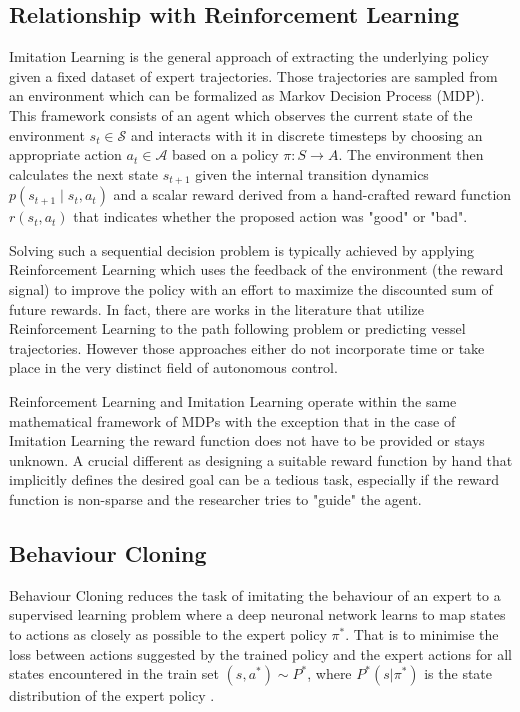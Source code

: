 \documentclass[conference]{IEEEtran}
\begin{document}
\subsection{Relationship with Reinforcement Learning}
Imitation Learning is the general approach of extracting the underlying policy given a fixed dataset of expert trajectories. Those trajectories are sampled from an environment which can be  formalized as Markov Decision Process (MDP). This framework consists of an agent which observes the current state of the environment $s_t \in \mathcal{S}$ and interacts with it in discrete timesteps by choosing an appropriate action $a_t \in \mathcal{A}$ based on a policy $\pi: S \rightarrow A$. The environment then calculates the next state $s_{t+1}$ given the internal transition dynamics $p(s_{t+1} \mid s_t, a_t)$  and a scalar reward derived from a hand-crafted reward function $r(s_t, a_t)$ that indicates whether the proposed action was "good" or "bad".
\par
Solving such a sequential decision problem is typically achieved by applying Reinforcement Learning which uses the feedback of the environment (the reward signal) to improve the policy with an effort to maximize the discounted sum of future rewards. In fact, there are works in the literature that utilize Reinforcement Learning to the path following problem or predicting vessel trajectories. However those approaches either do not incorporate time or take place in the very distinct field of autonomous control. 
\par
Reinforcement Learning and Imitation Learning operate within the same mathematical framework of MDPs with the exception that in the case of Imitation Learning the reward function does not have to be provided or stays unknown. A crucial different as designing a suitable reward function by hand that implicitly defines the desired goal can be a tedious task, especially if the reward function is non-sparse and the researcher tries to "guide" the agent.

\subsection{Behaviour Cloning}
Behaviour Cloning reduces the task of imitating the behaviour of an expert to a supervised learning problem where a deep neuronal network learns to map states to actions as closely as possible to the expert policy $\pi^*$. That is to minimise the loss between actions suggested by the trained policy and the expert actions for all states encountered in the train set $(s, a^*) \sim P^*$, where $P^*(s|\pi^*)$ is the state distribution of the expert policy \cite{le2022survey}.
\end{document}
